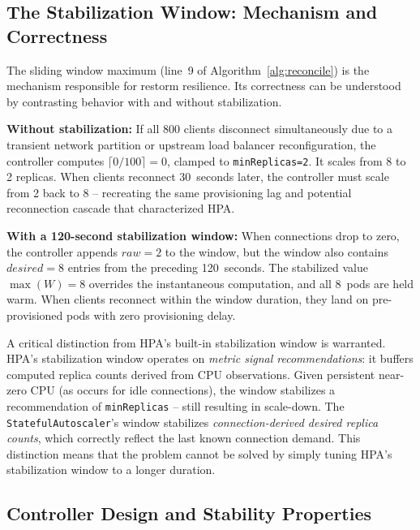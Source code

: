 \documentclass[twocolumn]{svjour3}
\begin{document}
\subsection{The Stabilization Window: Mechanism and Correctness}

The sliding window maximum (line~9 of Algorithm~\ref{alg:reconcile}) is the mechanism responsible for restorm resilience. Its correctness can be understood by contrasting behavior with and without stabilization.

\textbf{Without stabilization:} If all 800 clients disconnect simultaneously due to a transient network partition or upstream load balancer reconfiguration, the controller computes $\lceil 0/100 \rceil = 0$, clamped to \texttt{minReplicas=2}. It scales from 8 to 2 replicas. When clients reconnect 30~seconds later, the controller must scale from 2 back to 8 -- recreating the same provisioning lag and potential reconnection cascade that characterized HPA.

\textbf{With a 120-second stabilization window:} When connections drop to zero, the controller appends $raw=2$ to the window, but the window also contains $desired=8$ entries from the preceding 120~seconds. The stabilized value $\max(W)=8$ overrides the instantaneous computation, and all 8~pods are held warm. When clients reconnect within the window duration, they land on pre-provisioned pods with zero provisioning delay.

A critical distinction from HPA's built-in stabilization window is warranted. HPA's stabilization window operates on \textit{metric signal recommendations}: it buffers computed replica counts derived from CPU observations. Given persistent near-zero CPU (as occurs for idle connections), the window stabilizes a recommendation of \texttt{minReplicas} -- still resulting in scale-down. The \texttt{StatefulAutoscaler}'s window stabilizes \textit{connection-derived desired replica counts}, which correctly reflect the last known connection demand. This distinction means that the problem cannot be solved by simply tuning HPA's stabilization window to a longer duration.

\subsection{Controller Design and Stability Properties}
\label{sec:controller_stability}
\end{document}
